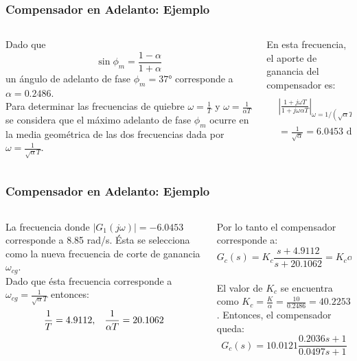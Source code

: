 \documentclass[aspectratio=169]{beamer}
\theoremstyle{definition}
\theoremstyle{plain}
\theoremstyle{remark}
\begin{document}
\begin{frame}[<+->]\frametitle{Compensador en Adelanto: Ejemplo}
\vspace*{5mm}
\begin{columns}
	\begin{column}{0.5\textwidth}		
	Dado que
	\begin{equation*}
		\sin \phi_m = \frac{1-\alpha}{1+\alpha}
	\end{equation*}
	un ángulo de adelanto de fase $\phi_m = \ang{37}$ corresponde a $\alpha = 0.2486$.
	\pause\\
	\vspace*{3mm}
	Para determinar las frecuencias de quiebre $\omega = \frac{1}{T}$ y $\omega = \frac{1}{\alpha T}$ se considera que el máximo adelanto de fase $\phi_m$ ocurre en la media geométrica de las dos frecuencias dada por $\omega = \frac{1}{\sqrt{\alpha}T}$.
	\pause
	\end{column}
	\begin{column}{0.5\textwidth}
	En esta frecuencia, el aporte de ganancia del compensador es:
	\begin{align*}
		&\left| \frac{1+j\omega T}{1 + j\omega \alpha T} \right|_{\omega = 1/(\sqrt{\alpha}T)} = \left| \frac{1+j\frac{1}{\sqrt{\alpha}}}{1+j\alpha\frac{1}{\sqrt{\alpha}}} \right|\\
		 &= \frac{1}{\sqrt{\alpha}} = 6.0453 \text{ dB}
	\end{align*}
	\end{column}
\end{columns}
\end{frame}

\begin{frame}[<+->]\frametitle{Compensador en Adelanto: Ejemplo}
\begin{columns}
	\begin{column}{0.5\textwidth}
	La frecuencia donde $|G_1(j\omega)| = -6.0453$ corresponde a 8.85 rad/s. Ésta se selecciona como la nueva frecuencia de corte de ganancia $\omega_{cg}$.
	\pause\\
	\vspace*{3mm}
	Dado que ésta frecuencia corresponde a $\omega_{cg} = \frac{1}{\sqrt{\alpha}T}$ entonces:
	\begin{equation*}
		 \frac{1}{T} = 4.9112,\hspace*{3mm} \frac{1}{\alpha T} = 20.1062
	\end{equation*}
	\pause
	\end{column}
	\begin{column}{0.5\textwidth}
	Por lo tanto el compensador corresponde a:
	\begin{equation*}
		G_c(s) = K_c\frac{s+4.9112}{s+20.1062} = K_c \alpha \frac{0.2036s + 1}{0.0497s + 1}
	\end{equation*}
	\pause\\
	El valor de $K_c$ se encuentra como $K_c = \frac{K}{\alpha} = \frac{10}{0.2486} = 40.2253$. Entonces, el compensador queda:
	\begin{equation*}
		G_c(s) = 10.0121 \frac{0.2036s + 1}{0.0497s + 1}
	\end{equation*}
	\end{column}
\end{columns}
\end{frame}
\end{document}
